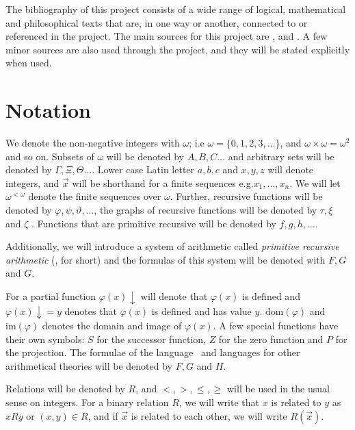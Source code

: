 \documentclass[../main.tex]{subfiles}
\begin{document}
The bibliography of this project consists of a wide range of logical,
mathematical and philosophical texts that are, in one way or another, connected to or referenced in the project. 
The main sources for this project
are \parencite{Smor1985}, \parencite{Boolos1993} and \parencite{Soare1987}. A
few minor sources are also used through the project, and they will be stated
explicitly when used.

\section{Notation}

We denote the non-negative integers with $\omega$; i.e
$\omega=\{0,1,2,3,\ldots\}$, and $\omega\times\omega=\omega^2$ and so on.
Subsets of $\omega$ will be denoted by $A,B,C\ldots$ and arbitrary sets will be
denoted by
$\Gamma,\Xi,\Theta\ldots$. Lower case Latin letter $a,b,c$ and $x,y,z$ will
denote integers, and $\vec{x}$ will be shorthand for a finite sequences e.g.$x_1,\ldots,x_n$.
We will let $\omega^{<\omega}$ denote the finite sequences over $\omega$.
Further, recursive functions will be denoted by
$\varphi,\psi,\vartheta,\ldots$, the graphs of recursive functions will be
denoted by $\tau,\xi$ and $\zeta$ . Functions that are primitive recursive will be denoted by
$f,g,h,\ldots$. 

Additionally, we  will introduce a system of arithmetic called \textit{primitive
recursive arithmetic} (\PRA, for short) and the formulas of this
system will be denoted with $F,G$ and $G$.

For a partial function $\varphi(x)\downarrow$ will denote that $\varphi(x)$ is defined and
$\varphi(x)\downarrow=y$ denotes that $\varphi(x)$ is defined and has value $y$.
 $\text{dom}(\varphi)$ and $\text{im}
(\varphi)$ denotes the
domain and image of $\varphi(x)$.
A few special functions have their own symbols: $S$ for the
successor function, $Z$ for the zero function and $P$ for the projection.
The formulae of the language \PRA\ and languages for other arithmetical
theories will be denoted by $F,G$ and $H$.

Relations will be denoted by $R$, and $<,>,\leq,\geq$ will be used in the usual
sense on integers. For a binary relation $R$, we will write that $x$ is related
to $y$ as $xRy$ or $(x,y)\in R$, and if $\vec x$ is related to each other, we
will write $R(\vec x)$.
\end{document}

